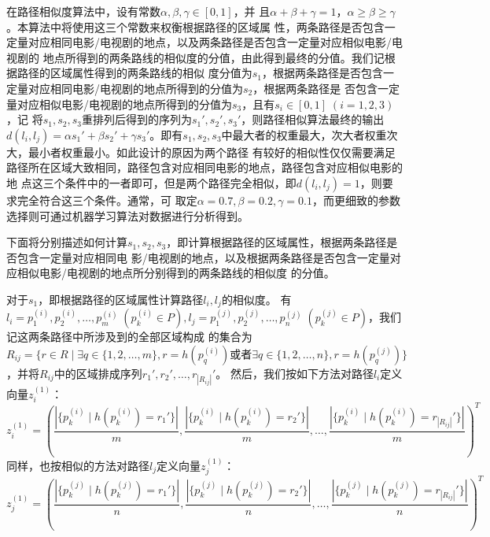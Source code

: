 在路径相似度算法中，设有常数$\alpha,\beta,\gamma\in[0,1]$，并
且$\alpha+\beta+\gamma=1$，$\alpha\ge\beta\ge\gamma$。本算法中将使用这三个常数来权衡根据路径的区域属
性，两条路径是否包含一定量对应相同电影/电视剧的地点，以及两条路径是否包含一定量对应相似电影/电视剧的
地点所得到的两条路线的相似度的分值，由此得到最终的分值。我们记根据路径的区域属性得到的两条路线的相似
度分值为$s_1$，根据两条路径是否包含一定量对应相同电影/电视剧的地点所得到的分值为$s_2$，根据两条路径是
否包含一定量对应相似电影/电视剧的地点所得到的分值为$s_3$，且有$s_i\in[0,1]\;(i=1,2,3)$，记
将$s_1,s_2,s_3$重排列后得到的序列为$s_1',s_2',s_3'$，则路径相似算法最终的输出$d(l_i,l_j)=\alpha
s_1'+\beta s_2'+\gamma
s_3'$。即有$s_1,s_2,s_3$中最大者的权重最大，次大者权重次大，最小者权重最小。如此设计的原因为两个路径
有较好的相似性仅仅需要满足路径所在区域大致相同，路径包含对应相同电影的地点，路径包含对应相似电影的地
点这三个条件中的一者即可，但是两个路径完全相似，即$d(l_i,l_j)=1$，则要求完全符合这三个条件。通常，可
取定$\alpha=0.7, \beta=0.2, \gamma=0.1$，而更细致的参数选择则可通过机器学习算法对数据进行分析得到。

下面将分别描述如何计算$s_1,s_2,s_3$，即计算根据路径的区域属性，根据两条路径是否包含一定量对应相同电
影/电视剧的地点，以及根据两条路径是否包含一定量对应相似电影/电视剧的地点所分别得到的两条路线的相似度
的分值。

对于$s_1$，即根据路径的区域属性计算路径$l_i,l_j$的相似度。
有$l_i=p^{(i)}_1,p^{(i)}_2,\dots,p^{(i)}_m\;(p^{(i)}_k\in P),
l_j=p^{(j)}_1,p^{(j)}_2,\dots,p^{(j)}_n\;(p^{(j)}_k\in P)$，我们记这两条路径中所涉及到的全部区域构成
的集合为$R_{ij}=\{r\in R\mid \exists q\in\{1,2,\dots,m\},r=h(p^{(i)}_q)\text{或者} \exists
q\in\{1,2,\dots,n\},r=h(p^{(j)}_q)\}$，并将$R_{ij}$中的区域排成序列$r_1',r_2',\dots,r_{|R_{ij}|}'$。
然后，我们按如下方法对路径$l_i$定义向量$z_i^{(1)}$：
\begin{displaymath}
  z_i^{(1)}=\left(\frac{\left |\{p^{(i)}_k\mid h(p^{(i)}_k)=r_1'\}\right |}{m}, \frac{\left |\{p^{(i)}_k\mid
        h(p^{(i)}_k)=r_2'\}\right |}{m},
    \dots,
    \frac{\left |\{p^{(i)}_k\mid h(p^{(i)}_k)=r_{|R_{ij}|}'\}\right |}{m}\right)^T
\end{displaymath}
同样，也按相似的方法对路径$l_j$定义向量$z_j^{(1)}$：
\begin{displaymath}
  z_j^{(1)}=\left(\frac{\left |\{p^{(j)}_k\mid h(p^{(j)}_k)=r_1'\}\right |}{n}, \frac{\left |\{p^{(j)}_k\mid
        h(p^{(j)}_k)=r_2'\}\right |}{n},
    \dots,
    \frac{\left |\{p^{(j)}_k\mid h(p^{(j)}_k)=r_{|R_{ij}|}'\}\right |}{n}\right)^T
\end{displaymath}

